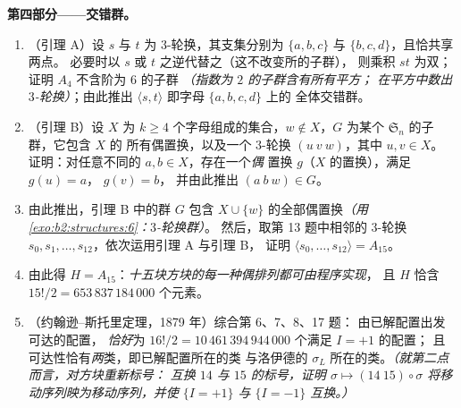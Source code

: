 \begin{problem}
\medskip
\noindent\textbf{第四部分——交错群。}
\begin{enumerate}[resume]
  \item （引理 A）设 $s$ 与 $t$ 为 $3$-轮换，其支集分别为 $\{a, b, c\}$
        与 $\{b, c, d\}$，且恰共享两点。
        必要时以 $s$ 或 $t$ 之逆代替之（这不改变所的子群），
        则乘积 $st$ 为双；
        证明 $A_4$ 不含阶为 $6$ 的子群
        \emph{（指数为 $2$ 的子群含有所有平方；
        在平方中数出 $3$-轮换）}；由此推出
        $\langle s, t\rangle$
        即字母 $\{a, b, c, d\}$ 上的
        全体交错群。
  \item （引理 B）设 $X$ 为 $k \geq 4$ 个字母组成的集合，$w
        \notin X$，$G$ 为某个 $\mathfrak{S}_n$ 的子群，它包含 $X$ 的
        所有偶置换，以及一个 $3$-轮换 $(u\ v\ w)$，其中 $u, v \in X$。
        证明：对任意不同的 $a, b \in X$，存在一个\emph{偶}
        置换 $g$（$X$ 的置换），满足 $g(u) = a$，
        $g(v) = b$，
        并由此推出 $(a\ b\ w) \in G$。
  \item 由此推出，引理 B 中的群 $G$ 包含
        $X \cup \{w\}$ 的全部偶置换\emph{（用
        \cref{exo:b2:structures:6}：$3$-轮换群）}。
        然后，取第 13 题中相邻的
        $3$-轮换 $s_0, s_1, \dots, s_{12}$，依次运用引理 A 与引理 B，
        证明 $\langle s_0, \dots, s_{12}\rangle = A_{15}$。
  \item 由此得 $H = A_{15}$：\emph{十五块方块的每一种偶排列都可由程序实现}，
        且 $H$ 恰含
        $15!/2 = 653\,837\,184\,000$ 个元素。
  \item （约翰逊–斯托里定理，1879 年）综合第 6、7、8、17 题：
        由已解配置出发可达的配置，
        \emph{恰好}为 $16!/2 =
        10\,461\,394\,944\,000$ 个满足 $I = +1$ 的配置；
        且可达性恰有\emph{两}类，即已解配置所在的类
        与洛伊德的
        $\sigma_L$ 所在的类。\emph{（就第二点而言，对方块重新标号：
        互换 $14$ 与 $15$ 的标号，证明 $\sigma \mapsto (14\ 15) \circ
        \sigma$ 将移动序列映为移动序列，并使
        $\{I = +1\}$ 与 $\{I = -1\}$ 互换。）}
\end{enumerate}


\end{problem}
